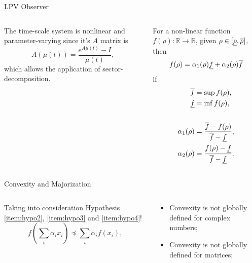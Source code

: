 \begin{slide}{LPV Observer}
  \begin{columns}[c]
    \begin{column}{0.55\textwidth}
      The time-scale system is nonlinear and parameter-varying since it's \(A\)
      matrix is
      \begin{equation}
        A(\mu(t)) = \frac{e^{A\mu(t)}-I}{\mu(t)},
      \end{equation}
      which allows the application of sector-decomposition.
    \end{column}%
    \hfill%
    \begin{column}{0.55\textwidth}
      For a non-linear function \(f(\rho):\mathbb{R}\rightarrow\mathbb{R}\), given
      \(\rho\in[\underline{\rho}, \overline{\rho}]\), then
      \begin{equation}
        f(\rho) = \alpha_{1}(\rho)\underline{f} + \alpha_{2}(\rho)\overline{f}
      \end{equation}
      if
      \begin{align}
        \overline{f}          & = \sup{f(\rho)},                             \\
        \underline{f}         & = \inf{f(\rho)},                             \\
        \nonumber                                                       \\
        \alpha_{1}(\rho) & = \frac{\overline{f}-f(\rho)}{\overline{f}-\underline{f}},  \\
        \alpha_{2}(\rho) & = \frac{f(\rho)-\underline{f}}{\overline{f}-\underline{f}}.
      \end{align}
    \end{column}%
  \end{columns}
\end{slide}

\begin{slide}{Convexity and Majorization}
  \begin{columns}[c]
    \begin{column}{0.55\textwidth}
      Taking into consideration Hypothesis \ref{item:hypo2}, \ref{item:hypo3}
      and \ref{item:hypo4}!
      \begin{equation}
        f(\sum_{i}\alpha_{i}x_{i}) \preceq \sum_{i}\alpha_{i}f(x_{i}),
      \end{equation}
    \end{column}%
    \hfill%
    \begin{column}{0.55\textwidth}
      \begin{itemize}
        \item Convexity is not globally defined for complex numbers;
        \item Convexity is not globally defined for matrices;
      \end{itemize}
    \end{column}%
  \end{columns}
\end{slide}

